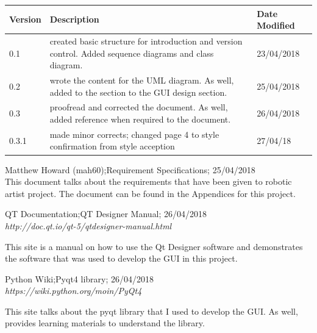\documentclass{article}
\begin{document}
\begin{center}

\begin{tabular}{| l | p{8cm} | p{3cm}|}

\hline

\textbf{Version} & \textbf{Description} & \textbf{Date Modified} \\\hline

0.1 & created basic structure for introduction and version control. Added sequence diagrams and class diagram. & 23/04/2018 \\ \hline
0.2 & wrote the content for the UML diagram. As well, added to the section to the GUI design section. & 25/04/2018\\ \hline
0.3 & proofread and corrected the document. As well, added reference when required to the document.& 26/04/2018\\ \hline
0.3.1 & made minor corrects; changed page 4 to style confirmation from style acception & 27/04/18 \\ \hline
\end{tabular}

    \begin{thebibliography}{9}


    Matthew Howard (mah60);Requirement Specifications; 25/04/2018 \\ 
    
    This document talks about the requirements that have been given to robotic artist project. The document can be found in the Appendices for this project.\\ 
    

    QT Documentation;QT Designer Manual; 26/04/2018 \\ 
    
    \textit{http://doc.qt.io/qt-5/qtdesigner-manual.html}
    
    This site is a manual on how to use the Qt Designer software and demonstrates the software that was used to develop the GUI in this project.\\ 
    

    Python Wiki;Pyqt4 library; 26/04/2018 \\ 
    
    \textit{https://wiki.python.org/moin/PyQt4}
    
    This site talks about the pyqt library that I used to develop the GUI. As well, provides learning materials to understand the library.\\ 
    

    \end{thebibliography}

\end{center}

 
\end{document}
